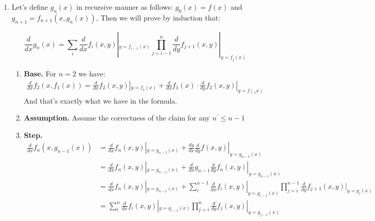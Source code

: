 \documentclass{article}
\begin{document}
\begin{enumerate}
\item Let's define $g_{n}(x)$ in recursive manner as follows: $g_{0}(x) = f(x)$ and $g_{n+1} = f_{n+1}(x,g_{n}(x))$, Then we will prove by induction that: 

\begin{equation*}
    \frac{d}{dx} g_{n}(x)  = \sum_{i} \frac{d}{dx}f_{i}(x,y)|_{y = f_{i-1}(x)} \prod_{j=i-1}^{n}\frac{d}{dy}f_{j+1}(x,y)|_{y = f_j(x)}
\end{equation*}

\begin{enumerate}
    \item \textbf{Base.} For $n=2$ we have: 
    \begin{equation*}
        \begin{split}
            \frac{d}{dx}f_2(x,f_1(x)) = \frac{d}{dx}f_{2}(x,y)|_{y=f_{1}(x)} +\frac{d}{dx}f_1(x)\cdot \frac{d}{dy}f_{2}(x,y)|_{y=f(_{1}x)}
        \end{split}
    \end{equation*}
    And that's exactly what we have in the formula. 
    \item \textbf{Assumption.} Assume the correctness of the claim for any $n^\prime \le n - 1 $
    \item \textbf{Step.}
\begin{equation*}
    \begin{split}
        \frac{d}{dx} f_{n}(x,g_{n-1}(x)) &= \frac{d}{dx}f_{n}(x,y)|_{y=g_{n-1}(x)} + \frac{dy}{dx}\frac{d}{dy}f(x,y)|_{y = g_{n-1}(x)} \\ 
        &=  \frac{d}{dx}f_{n}(x,y)|_{y=g_{n-1}(x)} + \frac{d}{dx}g_{n-1}\frac{d}{dy}f_{n}(x,y)|_{y = g_{n-1}(x)} \\
        & =  \frac{d}{dx}f_{n}(x,y)|_{y=g_{n-1}(x)}  + \sum_{i}^{n-1} \frac{d}{dx}f_{i}(x,y)|_{y = g_{i-1}(x)} \prod_{j=i}^{n-1}\frac{d}{dy}f_{j+1}(x,y)|_{y = g_j(x)}\\
        & = \sum_{i}^{n} \frac{d}{dx}f_{i}(x,y)|_{y = g_{i-1}(x)} \prod_{j=i}^{n}\frac{d}{dy}f_{j}(x,y)|_{y = g_{j-1}(x)}
    \end{split}
\end{equation*}


\end{enumerate}
\end{enumerate}
\end{document}
